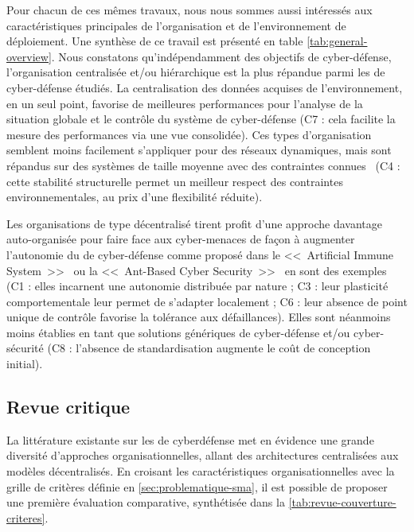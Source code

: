 Pour chacun de ces mêmes travaux, nous nous sommes aussi intéressés aux caractéristiques principales de l’organisation et de l'environnement de déploiement.
Une synthèse de ce travail est présenté en table \ref{tab:general-overview}.
Nous constatons qu'indépendamment des objectifs de cyber-défense, l'organisation centralisée et/ou hiérarchique est la plus répandue parmi les  de cyber-défense étudiés.
La centralisation des données acquises de l'environnement, en un seul point, favorise de meilleures performances pour l'analyse de la situation globale et le contrôle du système de cyber-défense (C7 : cela facilite la mesure des performances via une vue consolidée).
Ces types d'organisation semblent moins facilement s'appliquer pour des réseaux dynamiques, mais sont répandus sur des systèmes de taille moyenne avec des contraintes connues~\cite{vasilomanolakis2015taxonomy} (C4 : cette stabilité structurelle permet un meilleur respect des contraintes environnementales, au prix d’une flexibilité réduite).

Les organisations de type décentralisé tirent profit d'une approche davantage auto-organisée pour faire face aux cyber-menaces de façon à augmenter l'autonomie du  de cyber-défense comme proposé dans le <<~Artificial Immune System~>>~\cite{morteza2015method} ou la <<~Ant-Based Cyber Security~>>~\cite{haack2011ant} en sont des exemples (C1 : elles incarnent une autonomie distribuée par nature ; C3 : leur plasticité comportementale leur permet de s’adapter localement ; C6 : leur absence de point unique de contrôle favorise la tolérance aux défaillances).
Elles sont néanmoins moins établies en tant que solutions génériques de cyber-défense et/ou cyber-sécurité (C8 : l’absence de standardisation augmente le coût de conception initial).

\subsection{Revue critique}

La littérature existante sur les  de cyberdéfense met en évidence une grande diversité d'approches organisationnelles, allant des architectures centralisées aux modèles décentralisés. En croisant les caractéristiques organisationnelles avec la grille de critères définie en \autoref{sec:problematique-sma}, il est possible de proposer une première évaluation comparative, synthétisée dans la \autoref{tab:revue-couverture-criteres}.

